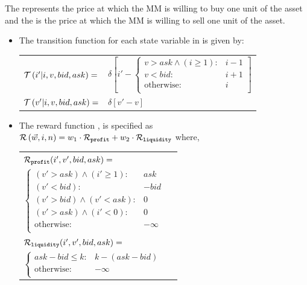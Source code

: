 The \bid represents the price at which the MM is willing to buy one unit of the asset and the \ask is the price at which the MM is willing to sell one unit of the asset.

\begin{itemize}
    \item The transition function {\footnotesize \Transition} for each state variable in {\footnotesize \State} is given by: \\   
    {\footnotesize 
        \abovedisplayskip=5pt
        \belowdisplayskip=0pt
        \renewcommand{\arraystretch}{1.5}
        \begin{tabular}{ll}
            $ \mathcal{T}\left( i' | i, v, bid, ask \right) =$ & $ \delta \left[ i' - \begin{cases}
            v > ask  \wedge (i \geq 1) : & i - 1 \\
            v < bid  : & i + 1 \\
            \text{otherwise} : & i \\
            \end{cases} \right] $ \\
            $ \mathcal{T}\left( v' | i, v, bid, ask \right) =$ & $ \delta \left[ v' - v \right] $ \\
        \end{tabular}
    }%
    \item The reward function {\footnotesize \Reward}, is specified as {\footnotesize $ \mathcal{R}\left(\vec{w}, i, n \right) = w_1 \cdot \mathcal{R}_{\mathtt{profit}} + w_2 \cdot \mathcal{R}_{\mathtt{liquidity}} $} where, \\
    {\footnotesize 
        \abovedisplayskip=10pt
        \belowdisplayskip=0pt
        \renewcommand{\arraystretch}{1.5}
        \begin{tabular}{ll}    
            $ \mathcal{R}_{\mathtt{profit}}(i', v', bid, ask) = $ & $ $ \\
            \qquad $ \begin{cases}
            (v' > ask) \wedge (i' \geq 1) : & ask \\
            (v' < bid) : & -bid \\
            (v' > bid) \wedge (v' < ask) : & 0 \\
            (v' > ask) \wedge (i' < 0) : & 0 \\
            \text{otherwise} : & -\infty \\
            \end{cases} $ & $ $ \\
            $ \mathcal{R}_{\mathtt{liquidity}}(i', v', bid, ask) = $ & $ $ \\
            \qquad $ \begin{cases}
            ask - bid \leq k : & k - (ask - bid) \\
            \text{otherwise} : & -\infty \\ 
            \end{cases} $ & $ $ \\
        \end{tabular}
    }    
\end{itemize}

